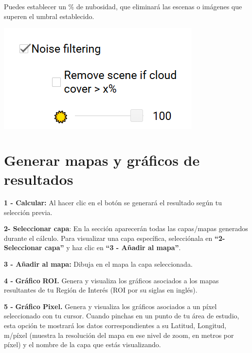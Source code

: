 \documentclass[
]{book}
\begin{document}
Puedes establecer un \% de nubosidad, que eliminará las escenas o imágenes que superen el umbral establecido.

\includegraphics{assets/filter.png}

\chapter{Generar mapas y gráficos de resultados}\label{mapas-graficos}

\textbf{1 - Calcular:} Al hacer clic en el botón se generará el resultado según tu selección previa.

\textbf{2- Seleccionar capa}: En la sección aparecerán todas las capas/mapas generados durante el cálculo. Para visualizar una capa específica, selecciónala en \textbf{``2- Seleccionar capa''} y haz clic en \textbf{``3 - Añadir al mapa''}.

\textbf{3 - Añadir al mapa:} Dibuja en el mapa la capa seleccionada.

\textbf{4 -} \textbf{Gráfico} \textbf{ROI.} Genera y visualiza los gráficos asociados a los mapas resultantes de tu Región de Interés (ROI por su siglas en inglés).

\textbf{5 -} \textbf{Gráfico Pixel.} Genera y visualiza los gráficos asociados a un píxel seleccionado con tu cursor. Cuando pinchas en un punto de tu área de estudio, esta opción te mostrará los datos correspondientes a su Latitud, Longitud, m/píxel (muestra la resolución del mapa en ese nivel de zoom, en metros por píxel) y el nombre de la capa que estás visualizando.

  
\end{document}
